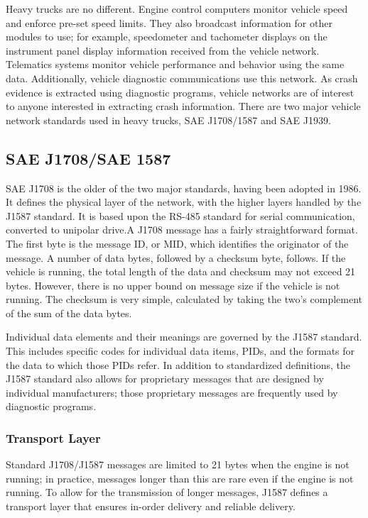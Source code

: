 Heavy trucks are no different. Engine control computers monitor vehicle speed and enforce pre-set speed limits. They also broadcast information
for other modules to use; for example, speedometer and tachometer displays on the instrument panel display information received from the vehicle
network. Telematics systems monitor vehicle performance and behavior using the same data. Additionally, vehicle diagnostic communications use
this network. As crash evidence is extracted using diagnostic programs, vehicle networks are of interest to anyone interested in extracting
crash information. There are two major vehicle network standards used in heavy trucks, SAE J1708/1587\cite{J1708}\cite{J1587} and SAE J1939\cite{J1939-71}.

\subsection{SAE J1708/SAE 1587}

SAE J1708 is the older of the two major standards, having been adopted in 1986. It defines the physical layer of the network,
with the higher layers handled by the J1587 standard. It is based upon the RS-485 standard for serial communication, converted to 
unipolar drive.A J1708 message has a fairly straightforward format. The first byte is the message ID, or MID, which identifies the originator of the message. A
number of data bytes, followed by a checksum byte, follows. If the vehicle is running, the total length of the data and checksum
may not exceed 21 bytes.\cite{J1708} However, there is no upper bound on message size if the vehicle is not running. The checksum is very simple,
calculated by taking the two's complement of the sum of the data bytes.

Individual data elements and their meanings are governed by the J1587 standard.\cite{J1587} This includes specific codes for individual data items, PIDs,
and the formats for the data to which those PIDs refer. In addition to standardized definitions, the J1587 standard also allows for proprietary
messages that are designed by individual manufacturers; those proprietary messages are frequently used by diagnostic programs.

\subsubsection{Transport Layer}

Standard J1708/J1587 messages are limited to 21 bytes when the engine is not running; in practice, messages longer than this are rare even if the engine
is not running. To allow for the transmission of longer messages, J1587 defines a transport layer that ensures in-order delivery and reliable delivery.

